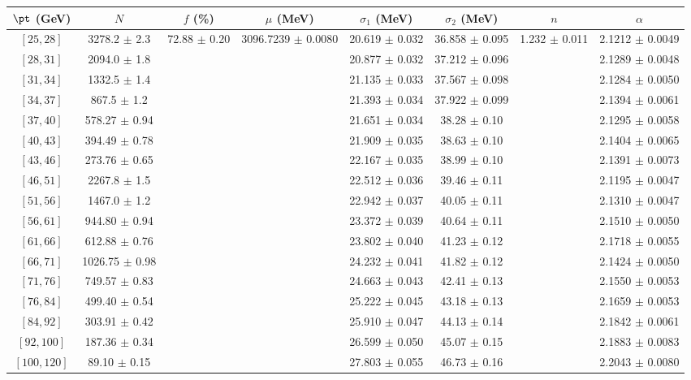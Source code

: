 \begin{tabular}{c||c|c|c|c|c|c|c}
$\pt$ (GeV) & $N$ & $f$ (\%) & $\mu$ (MeV) & $\sigma_1$ (MeV) & $\sigma_2$ (MeV) & $n$ & $\alpha$ \\
\hline
$[25, 28]$ & 3278.2 $\pm$ 2.3 & \multirow{17}{*}{72.88 $\pm$ 0.20} & \multirow{17}{*}{3096.7239 $\pm$ 0.0080} & 20.619 $\pm$ 0.032 & 36.858 $\pm$ 0.095 & \multirow{17}{*}{1.232 $\pm$ 0.011} & 2.1212 $\pm$ 0.0049\\
$[28, 31]$ & 2094.0 $\pm$ 1.8 &  &  & 20.877 $\pm$ 0.032 & 37.212 $\pm$ 0.096 &  & 2.1289 $\pm$ 0.0048\\
$[31, 34]$ & 1332.5 $\pm$ 1.4 &  &  & 21.135 $\pm$ 0.033 & 37.567 $\pm$ 0.098 &  & 2.1284 $\pm$ 0.0050\\
$[34, 37]$ & 867.5 $\pm$ 1.2 &  &  & 21.393 $\pm$ 0.034 & 37.922 $\pm$ 0.099 &  & 2.1394 $\pm$ 0.0061\\
$[37, 40]$ & 578.27 $\pm$ 0.94 &  &  & 21.651 $\pm$ 0.034 & 38.28 $\pm$ 0.10 &  & 2.1295 $\pm$ 0.0058\\
$[40, 43]$ & 394.49 $\pm$ 0.78 &  &  & 21.909 $\pm$ 0.035 & 38.63 $\pm$ 0.10 &  & 2.1404 $\pm$ 0.0065\\
$[43, 46]$ & 273.76 $\pm$ 0.65 &  &  & 22.167 $\pm$ 0.035 & 38.99 $\pm$ 0.10 &  & 2.1391 $\pm$ 0.0073\\
$[46, 51]$ & 2267.8 $\pm$ 1.5 &  &  & 22.512 $\pm$ 0.036 & 39.46 $\pm$ 0.11 &  & 2.1195 $\pm$ 0.0047\\
$[51, 56]$ & 1467.0 $\pm$ 1.2 &  &  & 22.942 $\pm$ 0.037 & 40.05 $\pm$ 0.11 &  & 2.1310 $\pm$ 0.0047\\
$[56, 61]$ & 944.80 $\pm$ 0.94 &  &  & 23.372 $\pm$ 0.039 & 40.64 $\pm$ 0.11 &  & 2.1510 $\pm$ 0.0050\\
$[61, 66]$ & 612.88 $\pm$ 0.76 &  &  & 23.802 $\pm$ 0.040 & 41.23 $\pm$ 0.12 &  & 2.1718 $\pm$ 0.0055\\
$[66, 71]$ & 1026.75 $\pm$ 0.98 &  &  & 24.232 $\pm$ 0.041 & 41.82 $\pm$ 0.12 &  & 2.1424 $\pm$ 0.0050\\
$[71, 76]$ & 749.57 $\pm$ 0.83 &  &  & 24.663 $\pm$ 0.043 & 42.41 $\pm$ 0.13 &  & 2.1550 $\pm$ 0.0053\\
$[76, 84]$ & 499.40 $\pm$ 0.54 &  &  & 25.222 $\pm$ 0.045 & 43.18 $\pm$ 0.13 &  & 2.1659 $\pm$ 0.0053\\
$[84, 92]$ & 303.91 $\pm$ 0.42 &  &  & 25.910 $\pm$ 0.047 & 44.13 $\pm$ 0.14 &  & 2.1842 $\pm$ 0.0061\\
$[92, 100]$ & 187.36 $\pm$ 0.34 &  &  & 26.599 $\pm$ 0.050 & 45.07 $\pm$ 0.15 &  & 2.1883 $\pm$ 0.0083\\
$[100, 120]$ & 89.10 $\pm$ 0.15 &  &  & 27.803 $\pm$ 0.055 & 46.73 $\pm$ 0.16 &  & 2.2043 $\pm$ 0.0080\\
\end{tabular}
